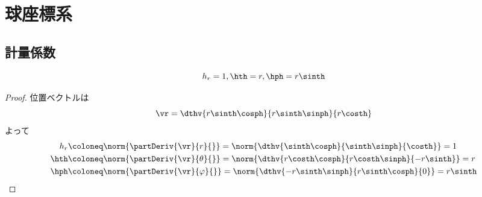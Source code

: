 \chapter{球座標系}
    \section{計量係数}
        \begin{shadebox}
            \[h_r = 1, \hth = r, \hph = r\sinth\]
        \end{shadebox}
        \begin{proof}
            位置ベクトルは
            \[\vr = \dthv{r\sinth\cosph}{r\sinth\sinph}{r\costh}\]
            よって
            \begin{align*}
                h_r &\coloneq \norm{\partDeriv{\vr}{r}{}} = \norm{\dthv{\sinth\cosph}{\sinth\sinph}{\costh}} = 1\\
                \hth &\coloneq \norm{\partDeriv{\vr}{\theta}{}} = \norm{\dthv{r\costh\cosph}{r\costh\sinph}{-r\sinth}} = r\\
                \hph &\coloneq \norm{\partDeriv{\vr}{\varphi}{}} = \norm{\dthv{-r\sinth\sinph}{r\sinth\cosph}{0}} = r\sinth
            \end{align*}
        \end{proof}
